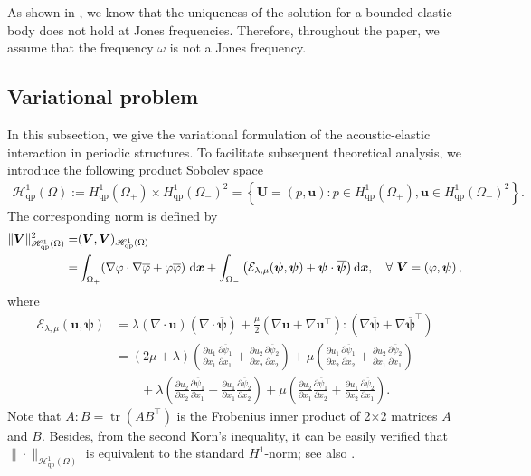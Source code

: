 \documentclass[final,3p,times]{elsarticle}
\begin{document}
As shown in \cite{Hu16}, we know that the uniqueness of the solution for a bounded elastic body does not hold at Jones frequencies. Therefore, throughout the paper, we assume that the frequency $\omega$ is not a Jones frequency.

\subsection{Variational problem}
In this subsection, we give the variational formulation of the acoustic-elastic interaction in periodic structures. To facilitate subsequent theoretical analysis, we introduce the following product Sobolev space
\begin{align*}
	\mathscr{H}^1_{\mathrm{qp}}(\Omega):= H_{\mathrm{qp}}^1\left(\Omega_+\right) \times H_{\mathrm{qp}}^1\left(\Omega_-\right)^2=\left\{\boldsymbol{U}=(p, \boldsymbol{u}): p \in H_{\mathrm{qp}}^1\left(\Omega_+\right), \boldsymbol{u} \in H_{\mathrm{qp}}^1\left(\Omega_-\right)^2\right\}.
\end{align*}
The corresponding norm is defined by
\begin{align*}
	\|\boldsymbol{V}\|_{\mathscr{H}^1_\mathrm{qp}(\Omega)}^2 = & (\boldsymbol{V}, \boldsymbol{V})_{\mathscr{H}^1_{\mathrm{qp}}(\Omega)}\\
	= &  \int_{\Omega_+}(\nabla \varphi \cdot \nabla \overline{\varphi} + \varphi \overline{\varphi}) \mathrm{~d} \boldsymbol{x} + \int_{\Omega_-}\left(\mathcal{E}_{\lambda, \mu}(\boldsymbol{\psi}, \boldsymbol{\psi}) + \boldsymbol{\psi} \cdot \overline{\boldsymbol{\psi}}\right) \mathrm{d} \boldsymbol{x}, \quad \forall~\boldsymbol{V} = \left(\varphi, \boldsymbol{\psi}\right) \notag,
\end{align*}
where 
\begin{align*}
	\mathcal{E}_{\lambda, \mu}(\boldsymbol{u}, \boldsymbol{\psi}) 
	& = \lambda(\nabla \cdot \boldsymbol{u})(\nabla \cdot \overline{\boldsymbol{\psi}})+\frac{\mu}{2}\left(\nabla \boldsymbol{u}+\nabla \boldsymbol{u}^{\top}\right):\left(\nabla \overline{\boldsymbol{\psi}}+\nabla \overline{\boldsymbol{\psi}}^{\top}\right)\\
	&=  (2 \mu + \lambda)\left(\frac{\partial u_1}{\partial x_1} \frac{\partial \overline{\psi}_1}{\partial x_1}+\frac{\partial u_2}{\partial x_2} \frac{\partial \overline{\psi}_2}{\partial x_2}\right)+\mu\left(\frac{\partial u_1}{\partial x_2} \frac{\partial \overline{\psi}_1}{\partial x_2}+\frac{\partial u_2}{\partial x_1} \frac{\partial \overline{\psi}_2}{\partial x_1}\right) \\
	&\qquad +\lambda\left(\frac{\partial u_2}{\partial x_2} \frac{\partial \overline{\psi}_1}{\partial x_1}+\frac{\partial u_1}{\partial x_1} \frac{\partial \overline{\psi}_2}{\partial x_2}\right)+\mu\left(\frac{\partial u_2}{\partial x_1} \frac{\partial \overline{\psi}_1}{\partial x_2}+\frac{\partial u_1}{\partial x_2} \frac{\partial \overline{\psi}_2}{\partial x_1}\right).
\end{align*}
Note that $A: B=\operatorname{tr}\left(A B^{\top}\right)$ is the Frobenius inner product of 2$\times$2 matrices $A$ and $B$. Besides, from the second Korn's inequality, it can be easily verified that $\|\cdot\|_{\mathscr{H}^1_\mathrm{qp}(\Omega)}$ is equivalent to the standard $H^1$-norm; see also \cite{Xu21}. 
\end{document}
